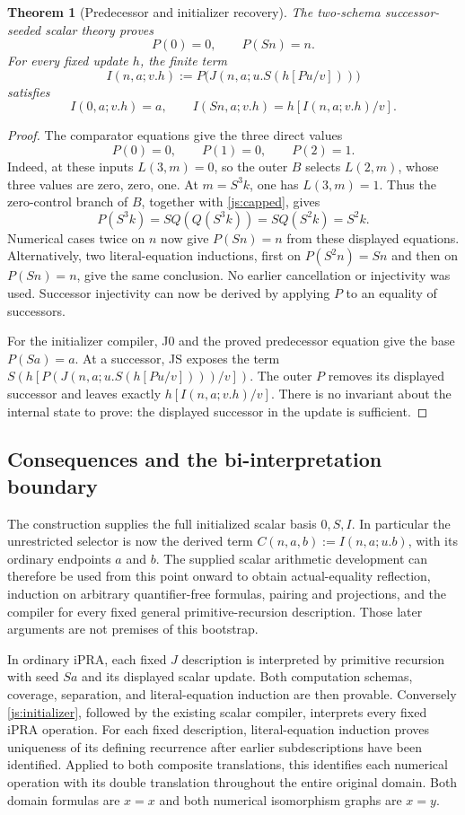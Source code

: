 \documentclass[11pt,letterpaper]{article}
\newtheorem{theorem}{Theorem}[section]
\theoremstyle{definition}\newtheorem{definition}[theorem]{Definition}
\theoremstyle{remark}\newtheorem{remark}[theorem]{Remark}
\begin{document}
\begin{theorem}[Predecessor and initializer recovery]\label{js:recovery}
The two-schema successor-seeded scalar theory proves
\[
 P(0)=0,\qquad P(Sn)=n.
\]
For every fixed update $h$, the finite term
\[
 I(n,a;v.h):=
 P\bigl(J(n,a;u.S(h[Pu/v]))\bigr)
 \tag{Initializer compiler}\label{js:initializer}
\]
satisfies
\[
 I(0,a;v.h)=a,\qquad I(Sn,a;v.h)=h[I(n,a;v.h)/v].
\]
\end{theorem}
\begin{proof}
The comparator equations give the three direct values
\[
 P(0)=0,\qquad P(1)=0,\qquad P(2)=1.
\]
Indeed, at these inputs $L(3,m)=0$, so the outer $B$ selects
$L(2,m)$, whose three values are zero, zero, one.
At $m=S^3k$, one has $L(3,m)=1$.  Thus the zero-control branch
of $B$, together with \eqref{js:capped}, gives
\[
 P(S^3k)=S Q(Q(S^3k))=S Q(S^2k)=S^2k.
\]
Numerical cases twice on $n$ now give $P(Sn)=n$ from these displayed
equations.  Alternatively, two literal-equation inductions, first on
$P(S^2n)=Sn$ and then on $P(Sn)=n$, give the same conclusion.
No earlier cancellation or injectivity was used.  Successor injectivity
can now be derived by applying $P$ to an equality of successors.

For the initializer compiler, J0 and the proved predecessor equation
give the base $P(Sa)=a$.  At a successor, JS exposes the term
$S(h[P(J(n,a;u.S(h[Pu/v])))/v])$.  The outer $P$ removes its
displayed successor and leaves exactly $h[I(n,a;v.h)/v]$.
There is no invariant about the internal state to prove: the displayed
successor in the update is sufficient.
\end{proof}

\subsection{Consequences and the bi-interpretation boundary}

The construction supplies the full initialized scalar basis $0,S,I$.
In particular the unrestricted selector is now the derived term
$C(n,a,b):=I(n,a;u.b)$, with its ordinary endpoints $a$ and $b$.
The supplied scalar arithmetic development can therefore be used from
this point onward to obtain actual-equality reflection, induction on
arbitrary quantifier-free formulas, pairing and projections, and the
compiler for every fixed general primitive-recursion description.
Those later arguments are not premises of this bootstrap.

In ordinary iPRA, each fixed $J$ description is interpreted by primitive
recursion with seed $Sa$ and its displayed scalar update.  Both
computation schemas, coverage, separation, and literal-equation induction
are then provable.  Conversely \eqref{js:initializer}, followed by the
existing scalar compiler, interprets every fixed iPRA operation.
For each fixed description, literal-equation induction proves uniqueness
of its defining recurrence after earlier subdescriptions have been
identified.  Applied to both composite translations, this identifies
each numerical operation with its double translation throughout the
entire original domain.  Both domain formulas are $x=x$ and both
numerical isomorphism graphs are $x=y$.
\end{document}
